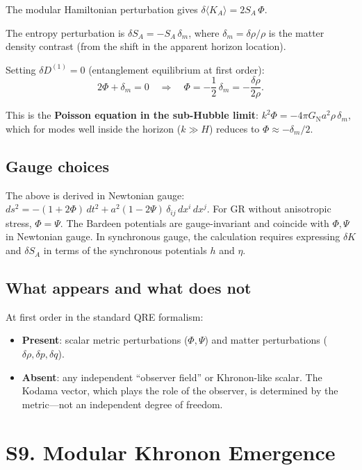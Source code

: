 \documentclass[aps,prd,preprint,superscriptaddress,longbibliography]{revtex4-2}
\newcommand{\KL}{D}
\newcommand{\GN}{G_{\mathrm{N}}}
\begin{document}
The modular Hamiltonian perturbation gives
$\delta\langle K_A\rangle = 2S_A\,\Phi$.

The entropy perturbation is
$\delta S_A = -S_A\,\delta_m$, where $\delta_m = \delta\rho/\rho$
is the matter density contrast (from the shift in the apparent
horizon location).

Setting $\delta\KL^{(1)} = 0$ (entanglement equilibrium at first
order):
\begin{equation}
2\Phi + \delta_m = 0
\quad\Longrightarrow\quad
\Phi = -\frac{1}{2}\,\delta_m = -\frac{\delta\rho}{2\rho}.
\label{eq:Poisson}
\end{equation}

This is the \textbf{Poisson equation in the sub-Hubble limit}:
$k^2\Phi = -4\pi\GN a^2\rho\,\delta_m$, which for modes well inside
the horizon ($k\gg H$) reduces to $\Phi \approx -\delta_m/2$.

\subsection{Gauge choices}

The above is derived in Newtonian gauge:
$ds^2 = -(1+2\Phi)\,dt^2 + a^2(1-2\Psi)\,\delta_{ij}\,dx^i\,dx^j$.
For GR without anisotropic stress, $\Phi = \Psi$.  The Bardeen
potentials are gauge-invariant and coincide with $\Phi,\Psi$ in
Newtonian gauge.  In synchronous gauge, the calculation requires
expressing $\delta K$ and $\delta S_A$ in terms of the synchronous
potentials $h$ and $\eta$.

\subsection{What appears and what does not}

At first order in the standard QRE formalism:
\begin{itemize}
\item \textbf{Present}: scalar metric perturbations ($\Phi,\Psi$)
  and matter perturbations ($\delta\rho,\delta p,\delta q$).
\item \textbf{Absent}: any independent ``observer field'' or
  Khronon-like scalar.  The Kodama vector, which plays the role of
  the observer, is determined by the metric---not an independent
  degree of freedom.
\end{itemize}

\section{S9. Modular Khronon Emergence}
\label{sec:khronon}
\end{document}
